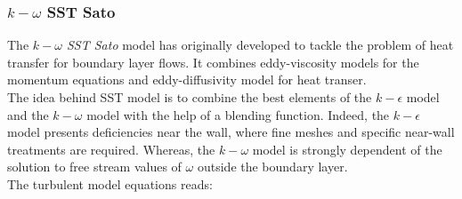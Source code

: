 \documentclass[11pt,a4paper]{article}
\begin{document}
\subsubsection{$k-\omega$ SST Sato}
The \textit{$k-\omega$ SST Sato} model \citep{SSTSato} has originally developed to tackle the problem of heat transfer for boundary layer flows. It combines eddy-viscosity models for the momentum equations and eddy-diffusivity model for heat transer. \\
The idea behind SST model is to combine the best elements of the $k-\epsilon$ model and the $k-\omega$ model with the help of a blending function. Indeed, the $k-\epsilon$ model presents deficiencies near the wall, where fine meshes and specific near-wall treatments are required. Whereas, the $k-\omega$ model is strongly dependent of the solution to free stream values of $\omega$ outside the boundary layer.\\
The turbulent model equations reads:
\end{document}
